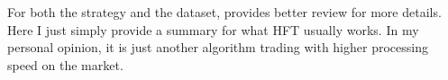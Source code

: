 \documentclass{article}
\begin{document}
For both the strategy and the dataset, \cite{gomber2011high} provides better review for more details.
Here I just simply provide a summary for what HFT usually works. In my personal opinion, it is just another 
algorithm trading with higher processing speed on the market. 








\end{document}
